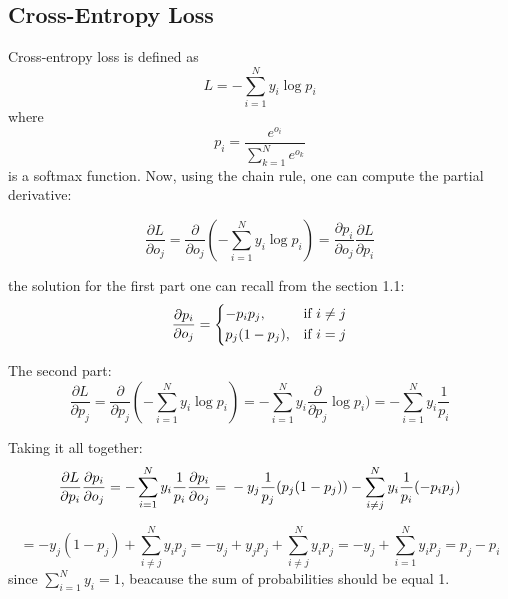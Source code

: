 \documentclass{article}
\begin{document}
\subsection{Cross-Entropy Loss}
Cross-entropy loss is defined as
\begin{equation}
    \label{8}
    L = - \sum_{i=1}^{N} y_i  \log{p_i}
\end{equation}
where
\begin{equation}
    \label{9}
    p_i = \frac{e^{o_i}}{\sum_{k=1}^{N} e^{o_k}}
\end{equation}
is a softmax function. Now, using the chain rule, one can compute the partial derivative:

\begin{equation}
    \label{10}
    \frac{\partial{L}}{\partial{o_j}} = \frac{\partial}{\partial{o_j}} (- \sum_{i=1}^{N} y_i  \log{p_i}) = \frac{\partial{p_i}}{\partial{o_j}} \frac{\partial{L}}{\partial{p_i}} 
\end{equation}

the solution for the first part one can recall from the section 1.1:
\begin{equation}
    \label{11}
	\frac{\partial{p_i}}{\partial{o_j}}= 
	\begin{dcases}
    	-p_i p_j, & \text{if } i \neq j\\
    	 p_j(1-p_j), & \text{if } i = j
	\end{dcases}
\end{equation}

The second part:
\begin{equation}
    \label{12}
\frac{\partial{L}}{\partial{p_j}} = \frac{\partial}{\partial{p_j}} (- \sum_{i=1}^{N} y_i  \log{p_i}) = - \sum_{i=1}^{N} y_i \frac{\partial}{\partial{p_j}} \log{p_i}) =  - \sum_{i=1}^{N} y_i \frac{1}{p_i}
\end{equation}

Taking it all together:
\begin{equation}
    \label{13}
\frac{\partial{L}}{\partial{p_i}} \frac{\partial{p_i}}{\partial{o_j}}  = - \sum_{i=1}^{N} y_i \frac{1}{p_i} \frac{\partial{p_i}}{\partial{o_j}} = \\
- y_j \frac{1}{p_j} (p_j(1-p_j)) - \sum_{i \neq j}^{N} y_i \frac{1}{p_i} (-p_i p_j)
\end{equation}

\begin{equation}
    \label{14}
= - y_j (1-p_j) + \sum_{i \neq j}^{N} y_i p_j = -y_j + y_j p_j + \sum_{i \neq j}^{N} y_i p_j = - y_j + \sum_{i =1 }^{N} y_i p_j = p_j - p_i
\end{equation}
since $\sum_{i =1 }^{N} y_i = 1$, beacause the sum of probabilities should be equal 1.
\end{document}
